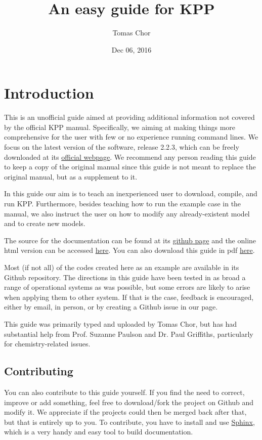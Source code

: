 \documentclass[letterpaper,10pt,openany,oneside]{sphinxmanual}
\title{An easy guide for KPP}
\date{Dec 06, 2016}
\author{Tomas Chor}
\begin{document}
\maketitle
\tableofcontents
{}\label{index::doc}



\chapter{Introduction}
\label{README:introduction}\label{README:easy-guide-to-compiling-and-running-kpp}\label{README::doc}
This is an unofficial guide aimed at providing additional information not
covered by the official KPP manual. Specifically, we aiming at making things
more comprehensive for the user with few or no experience running command
lines. We focus on the latest version of the software, release 2.2.3, which can
be freely downloaded at its \href{http://people.cs.vt.edu/~asandu/Software/Kpp/}{official webpage}. We recommend any person
reading this guide to keep a copy of the original manual since this guide is
not meant to replace the original manual, but as a supplement to it.

In this guide our aim is to teach an inexperienced user to download, compile,
and run KPP. Furthermore, besides teaching how to run the example case in the
manual, we also instruct the user on how to modify any already-existent model
and to create new models.

The source for the documentation can be found at its \href{https://github.com/tomchor/ezkpp}{github page} and the online html version can be
accessed \href{https://tomchor.github.io/ezkpp/}{here}. You can also download this
guide in pdf \href{https://github.com/tomchor/ezkpp/raw/gh-pages/ezkpp.pdf}{here}.

Most (if not all) of the codes created here as an example are available in its
Github repository. The directions in this guide have been tested in as broad a
range of operational systems as was possible, but some errors are likely to
arise when applying them to other system. If that is the case, feedback is
encouraged, either by email, in person, or by creating a Github issue in our
page.

This guide was primarily typed and uploaded by Tomas Chor, but has had
substantial help from Prof. Suzanne Paulson and Dr. Paul Griffiths,
particularly for chemistry-related issues.


\section{Contributing}
\label{README:contributing}
You can also contribute to this guide yourself. If you find the need to
correct, improve or add something, feel free to download/fork the project on
Github and modify it. We appreciate if the projects could then be merged back
after that, but that is entirely up to you. To contribute, you have to install
and use \href{http://sphinx-doc.org/}{Sphinx}, which is a very handy and easy tool
to build documentation.
\end{document}
